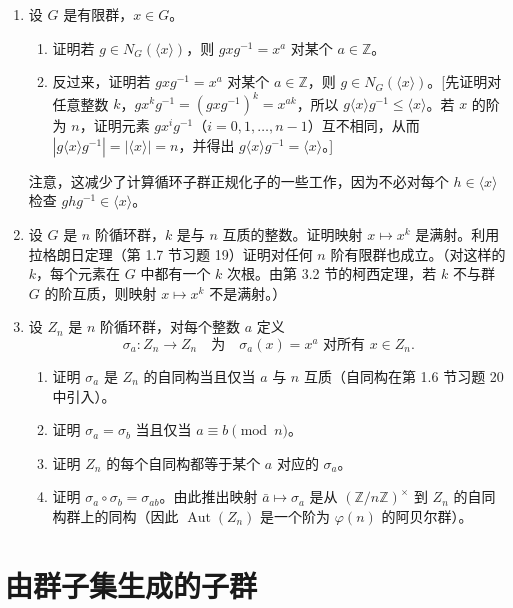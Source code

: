 \begin{enumerate}[label=\arabic*]
\item 设 \(G\) 是有限群，\(x \in G\)。
\begin{enumerate}[label=(\alph*)]
\item 证明若 \(g \in N_G(\langle x \rangle)\)，则 \(gxg^{-1} = x^a\) 对某个 \(a \in \mathbb{Z}\)。
\item 反过来，证明若 \(gxg^{-1} = x^a\) 对某个 \(a \in \mathbb{Z}\)，则 \(g \in N_G(\langle x \rangle)\)。[先证明对任意整数 \(k\)，\(gx^k g^{-1} = (gxg^{-1})^k = x^{ak}\)，所以 \(g\langle x \rangle g^{-1} \leq \langle x \rangle\)。若 \(x\) 的阶为 \(n\)，证明元素 \(gx^i g^{-1}\)（\(i = 0, 1, \ldots, n-1\)）互不相同，从而 \(|g\langle x \rangle g^{-1}| = |\langle x \rangle| = n\)，并得出 \(g\langle x \rangle g^{-1} = \langle x \rangle\)。]
\end{enumerate}
注意，这减少了计算循环子群正规化子的一些工作，因为不必对每个 \(h \in \langle x \rangle\) 检查 \(ghg^{-1} \in \langle x \rangle\)。

\item 设 \(G\) 是 \(n\) 阶循环群，\(k\) 是与 \(n\) 互质的整数。证明映射 \(x \mapsto x^k\) 是满射。利用拉格朗日定理（第 1.7 节习题 19）证明对任何 \(n\) 阶有限群也成立。（对这样的 \(k\)，每个元素在 \(G\) 中都有一个 \(k\) 次根。由第 3.2 节的柯西定理，若 \(k\) 不与群 \(G\) 的阶互质，则映射 \(x \mapsto x^k\) 不是满射。）

\item 设 \(Z_n\) 是 \(n\) 阶循环群，对每个整数 \(a\) 定义
\[
\sigma_a : Z_n \to Z_n \quad \text{为} \quad \sigma_a(x) = x^a \text{ 对所有 } x \in Z_n.
\]
\begin{enumerate}[label=(\alph*)]
\item 证明 \(\sigma_a\) 是 \(Z_n\) 的自同构当且仅当 \(a\) 与 \(n\) 互质（自同构在第 1.6 节习题 20 中引入）。
\item 证明 \(\sigma_a = \sigma_b\) 当且仅当 \(a \equiv b \pmod{n}\)。
\item 证明 \(Z_n\) 的每个自同构都等于某个 \(a\) 对应的 \(\sigma_a\)。
\item 证明 \(\sigma_a \circ \sigma_b = \sigma_{ab}\)。由此推出映射 \(\bar{a} \mapsto \sigma_a\) 是从 \((\mathbb{Z}/n\mathbb{Z})^\times\) 到 \(Z_n\) 的自同构群上的同构（因此 \(\operatorname{Aut}(Z_n)\) 是一个阶为 \(\varphi(n)\) 的阿贝尔群）。
\end{enumerate}
\end{enumerate}


\section{由群子集生成的子群}

